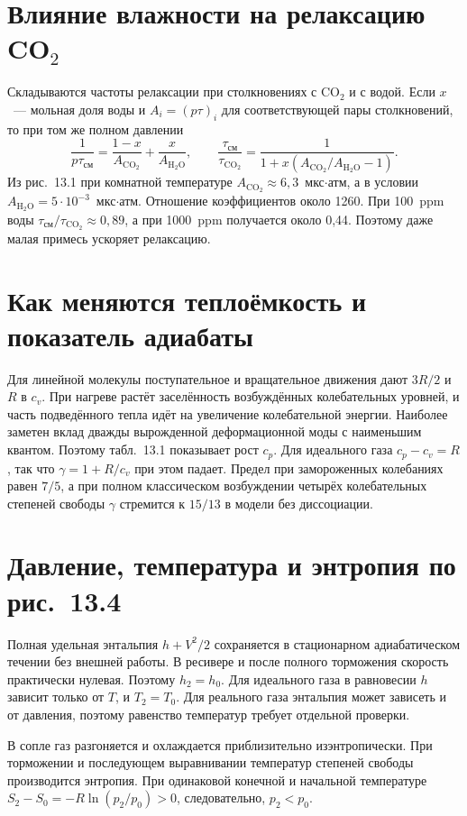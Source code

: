 \documentclass[12pt,a4paper]{article}
\newcommand{\COO}{\mathrm{CO_2}}
\begin{document}
\section{Влияние влажности на релаксацию CO$_2$}

Складываются частоты релаксации при столкновениях с CO$_2$ и с водой.
Если $x$~--- мольная доля воды и $A_i=(p\tau)_i$ для соответствующей
пары столкновений, то при том же полном давлении
\[
 \frac{1}{p\tau_{\text{см}}}=\frac{1-x}{A_{\COO}}+
                  \frac{x}{A_{\mathrm{H_2O}}},\qquad
 \frac{\tau_{\text{см}}}{\tau_{\COO}}
 =\frac{1}{1+x(A_{\COO}/A_{\mathrm{H_2O}}-1)}.
\]
Из рис.~13.1 при комнатной температуре $A_{\COO}\approx6{,}3$~мкс$\cdot$атм,
а в условии $A_{\mathrm{H_2O}}=5\cdot10^{-3}$~мкс$\cdot$атм.
Отношение коэффициентов около 1260. При 100~ppm воды
$\tau_{\text{см}}/\tau_{\COO}\approx0{,}89$, а при 1000~ppm
получается около 0,44. Поэтому даже малая примесь ускоряет релаксацию.

\section{Как меняются теплоёмкость и показатель адиабаты}

Для линейной молекулы поступательное и вращательное движения дают
$3R/2$ и $R$ в $c_v$. При нагреве растёт заселённость возбуждённых
колебательных уровней, и часть подведённого тепла идёт на увеличение
колебательной энергии. Наиболее заметен вклад дважды вырожденной
деформационной моды с наименьшим квантом. Поэтому табл.~13.1 показывает
рост $c_p$. Для идеального газа $c_p-c_v=R$, так что
$\gamma=1+R/c_v$ при этом падает. Предел при замороженных колебаниях
равен $7/5$, а при полном классическом возбуждении четырёх колебательных
степеней свободы $\gamma$ стремится к $15/13$ в модели без диссоциации.

\section{Давление, температура и энтропия по рис.~13.4}

Полная удельная энтальпия $h+V^2/2$ сохраняется в стационарном
адиабатическом течении без внешней работы. В ресивере и после полного
торможения скорость практически нулевая. Поэтому $h_2=h_0$.
Для идеального газа в равновесии $h$ зависит только от $T$, и
$T_2=T_0$. Для реального газа энтальпия может зависеть и от давления,
поэтому равенство температур требует отдельной проверки.

В сопле газ разгоняется и охлаждается приблизительно изэнтропически.
При торможении и последующем выравнивании температур степеней свободы
производится энтропия. При одинаковой конечной и начальной температуре
$S_2-S_0=-R\ln(p_2/p_0)>0$, следовательно, $p_2<p_0$.
\end{document}
